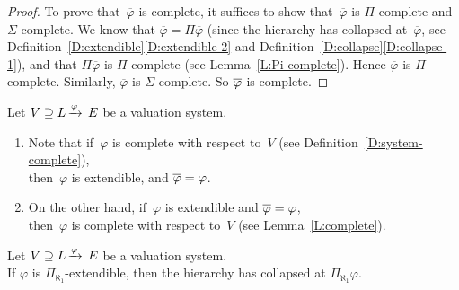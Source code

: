\begin{proof}
To prove that~$\overline\varphi$ is complete,
it suffices to show that~$\overline\varphi$
is $\Pi$-complete and $\Sigma$-complete.
We know that $\overline\varphi = \Pi\overline\varphi$
(since the hierarchy has collapsed at~$\overline\varphi$,
see Definition~\ref{D:extendible}\ref{D:extendible-2}
and Definition~\ref{D:collapse}\ref{D:collapse-1}),
and that $\Pi\overline\varphi$ is $\Pi$-complete
(see Lemma~\ref{L:Pi-complete}).
Hence $\overline\varphi$ is $\Pi$-complete.
Similarly,
$\overline\varphi$ is $\Sigma$-complete.
So $\overline\varphi$ is complete.
\end{proof}
%
%
\begin{rem}
\label{R:extendible-complete}
Let $V \supseteq L\,\smash{\xrightarrow{\varphi}\,E}$ be a valuation system.
\begin{enumerate}
\item
Note that if~$\varphi$ is complete with respect to~$V$
(see Definition~\ref{D:system-complete}),\\
then~$\varphi$ is extendible, and $\overline\varphi=\varphi$.
\item
On the other hand,
if~$\varphi$ is extendible and $\overline\varphi=\varphi$,\\
then~$\varphi$ is complete
with respect to~$V$
(see Lemma~\ref{L:complete}).
\end{enumerate}
\end{rem}
%
%
\begin{lem}
\label{L:aleph1}
Let $V \supseteq L\,\smash{\xrightarrow{\varphi}\,E}$ be a valuation system.\\
If $\varphi$ is $\Pi_{\aleph_1}$-extendible,
then the hierarchy has collapsed at $\Pi_{\aleph_1}\varphi$.
\end{lem}
